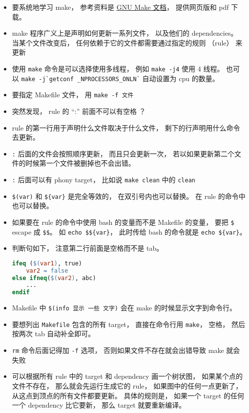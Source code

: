 


\begin{itemize}
\item 要系统地学习 make， 参考资料是 \href{https://www.gnu.org/software/make/manual/}{GNU Make 文档}， 提供网页版和 pdf 下载。
\item make 程序广义上是声明如何更新一系列文件， 以及他们的 dependencies。 当某个文件改变后， 任何依赖于它的文件都需要通过指定的规则 （rule） 来更新
\item 使用 \verb|make| 命令是可以选择使用多线程， 例如 \verb|make -j4| 使用 4 线程。 也可以 \verb|make -j`getconf _NPROCESSORS_ONLN`| 自动设置为 cpu 的数量。
\item 要指定 Makefile 文件， 用 \verb|make -f 文件|
\item 突然发现， rule 的 “:” 前面不可以有空格 ？
\item rule 的第一行用于声明什么文件取决于什么文件， 剩下的行声明用什么命令去更新。
\item \verb|:| 后面的文件会按照顺序更新， 而且只会更新一次， 若以如果更新第二个文件的时候第一个文件被删掉也不会出错。
\item \verb|:| 后面可以有 phony target， 比如说 \verb|make clean| 中的 \verb|clean|
\item \verb|$(var)| 和 \verb|${var}| 是完全等效的， 在双引号内也可以替换。 在 rule 的命令中也可以替换。
\item 如果要在 rule 的命令中使用 bash 的变量而不是 Makefile 的变量， 要把 \verb|$| escape 成 \verb|$$|。 如 \verb|echo $${var}|， 此时传给 bash 的命令就是 \verb|echo ${var}|。
\item 判断句如下， 注意第二行前面是空格而不是 tab。
\begin{lstlisting}[language=makefile]
ifeq ($(var1), true)
    var2 = false
else ifneq($(var2), abc)
    ...
endif
\end{lstlisting}
\item Makefile 中 \verb|$(info 显示 一些 文字)| 会在 make 的时候显示文字到命令行。
\item 要想列出 \verb|Makefile| 包含的所有 target， 直接在命令行用 \verb|make|， 空格， 然后按两次 tab 自动补全即可。
\item \verb|rm| 命令后面记得加 \verb|-f| 选项， 否则如果文件不存在就会出错导致 make 就会失败
\item 可以根据所有 rule 中的 target 和 dependency 画一个树状图， 如果某个点的文件不存在， 那么就会先运行生成它的 rule， 如果图中的任何一点更新了， 从这点到顶点的所有文件都要更新。 具体的规则是， 如果一个 target 的任何一个 dependency 比它要新， 那么 target 就要重新编译。

\end{itemize}
